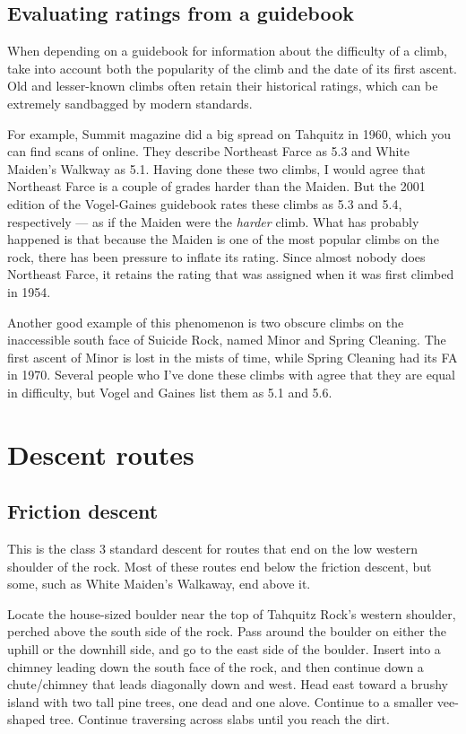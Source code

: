 \documentclass{tahquitz}
\begin{document}
\subsection{Evaluating ratings from a guidebook}

When depending on a guidebook for information about the difficulty of a climb, take
into account both the popularity of the climb and the date of its first ascent.
Old and lesser-known climbs often retain their historical ratings, which can be
extremely sandbagged by modern standards.

For example,
Summit magazine did a big spread on Tahquitz in 1960, which you can find scans of online.
They describe Northeast Farce as 5.3 and White Maiden's Walkway as 5.1. Having done
these two climbs, I would agree that Northeast Farce is a couple of grades harder
than the Maiden. But the 2001 edition
of the Vogel-Gaines guidebook rates these climbs as 5.3 and 5.4, respectively --- as if
the Maiden were the \emph{harder} climb. What has
probably happened is that because the Maiden is one of the most popular climbs on
the rock, there has been pressure to inflate its rating. Since almost nobody does Northeast
Farce, it retains the rating that was assigned when it was first climbed in 1954.

Another good example of this phenomenon is two obscure climbs on the inaccessible
south face of Suicide Rock, named Minor and Spring Cleaning. The first ascent of Minor is
lost in the mists of time, while Spring Cleaning had its FA in 1970. Several people who
I've done these climbs with agree that they are equal in difficulty, but Vogel and Gaines
list them as 5.1 and 5.6.

\pagebreak

\section{Descent routes}

\subsection{Friction descent}\label{subsec:friction-descent}

This is the class 3 standard descent for routes that end on the low western shoulder of the rock.
Most of these routes end below the friction descent, but some, such as White Maiden's Walkaway,
end above it.

Locate the house-sized boulder near the top of Tahquitz Rock's western shoulder,
perched above the south side of the rock. Pass around the boulder on either the
uphill or the downhill side, and go to the east side of the boulder. Insert into a chimney
leading down the south face of the rock, and then continue down a
chute/chimney that leads diagonally down and west.  Head east toward a
brushy island with two tall pine trees, one dead and one alove. Continue
to a smaller vee-shaped tree. Continue traversing across
slabs until you reach the dirt.
\end{document}
